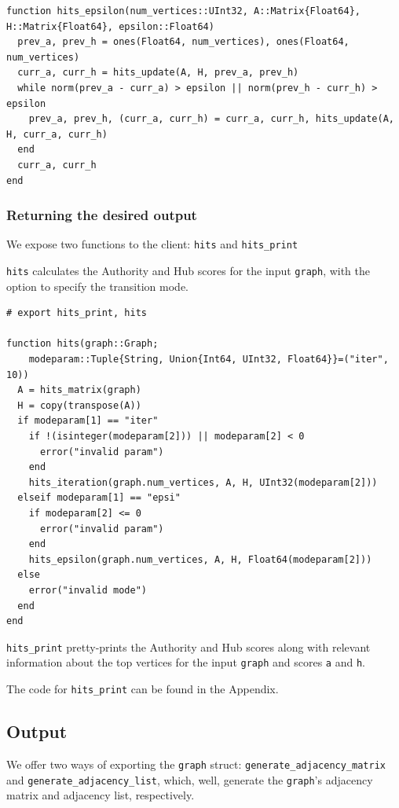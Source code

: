 \documentclass[12pt, titlepage, twoside]{amsart}
\begin{document}
\begin{verbatim}
function hits_epsilon(num_vertices::UInt32, A::Matrix{Float64}, H::Matrix{Float64}, epsilon::Float64)
  prev_a, prev_h = ones(Float64, num_vertices), ones(Float64, num_vertices)
  curr_a, curr_h = hits_update(A, H, prev_a, prev_h)
  while norm(prev_a - curr_a) > epsilon || norm(prev_h - curr_h) > epsilon
    prev_a, prev_h, (curr_a, curr_h) = curr_a, curr_h, hits_update(A, H, curr_a, curr_h)
  end
  curr_a, curr_h
end
\end{verbatim}

\subsubsection{Returning the desired output}

We expose two functions to the client: \texttt{hits} and \texttt{hits_print}

\texttt{hits} calculates the Authority and Hub scores for the input \texttt{graph},
with the option to specify the transition mode.

\begin{verbatim}
# export hits_print, hits

function hits(graph::Graph;
    modeparam::Tuple{String, Union{Int64, UInt32, Float64}}=("iter", 10))
  A = hits_matrix(graph)
  H = copy(transpose(A))
  if modeparam[1] == "iter"
    if !(isinteger(modeparam[2])) || modeparam[2] < 0
      error("invalid param")
    end
    hits_iteration(graph.num_vertices, A, H, UInt32(modeparam[2]))
  elseif modeparam[1] == "epsi"
    if modeparam[2] <= 0
      error("invalid param")
    end
    hits_epsilon(graph.num_vertices, A, H, Float64(modeparam[2]))
  else
    error("invalid mode")
  end
end
\end{verbatim}

\texttt{hits_print} pretty-prints the Authority and Hub scores along with relevant information
about the top vertices for the input \texttt{graph} and scores \texttt{a} and \texttt{h}.

The code for \texttt{hits_print} can be found in the Appendix.

\subsection{Output}

We offer two ways of exporting the \texttt{graph} struct: \texttt{generate_adjacency_matrix}
and \texttt{generate_adjacency_list}, which, well, generate the \texttt{graph}'s
adjacency matrix and adjacency list, respectively.
\end{document}
